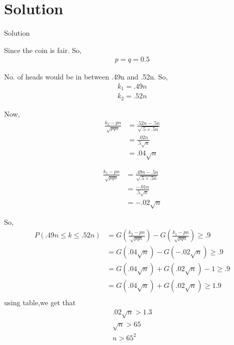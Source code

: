 \documentclass{beamer}
\begin{document}
\section{Solution}
\begin{frame}{Solution}
    


Since the coin is fair.
So,
\begin{align}
  p=q=0.5  
\end{align}


No. of heads would be in between .49n and .52n. 
So,
\begin{align}
    k_1=.49n          \\
k_2=.52n
\end{align}
\end{frame}
\begin{frame}
    


Now,
\begin{align}
    \frac{k_2-pn}{\sqrt{pqn}}&=\frac{.52n-.5n}{\sqrt{.5\times.5n}}  \nonumber \\
    &=\frac{.02n}{.5\sqrt{n}}           \nonumber \\
    &=.04\sqrt{n}
\end{align}

\begin{align}
     \frac{k_1-pn}{\sqrt{pqn}}&=\frac{.49n-.5n}{\sqrt{.5\times.5n}}  \nonumber \\
    &=\frac{-.01n}{.5\sqrt{n}}           \nonumber \\
    &=-.02\sqrt{n}
\end{align}
\end{frame}
\begin{frame}
So,
\begin{align}
    P(.49n \leq k \leq .52n)&=G(\frac{k_2-pn}{\sqrt{pqn}})-G(\frac{k_1-pn}{\sqrt{pqn}}) \geq .9  \nonumber\\
    &=G(.04\sqrt{n})-G(-.02\sqrt{n}) \geq .9    \nonumber  \\
    &=G(.04\sqrt{n})+G(.02\sqrt{n})-1  \geq .9    \nonumber \\
    &=G(.04\sqrt{n})+G(.02\sqrt{n})  \geq 1.9    \nonumber   \\
\end{align}
using table,we get that
\begin{align}
    .02\sqrt{n}>1.3  \nonumber \\
\sqrt{n}>65    \nonumber        \\
n>65^2
\end{align}
\end{frame}
\end{document}
